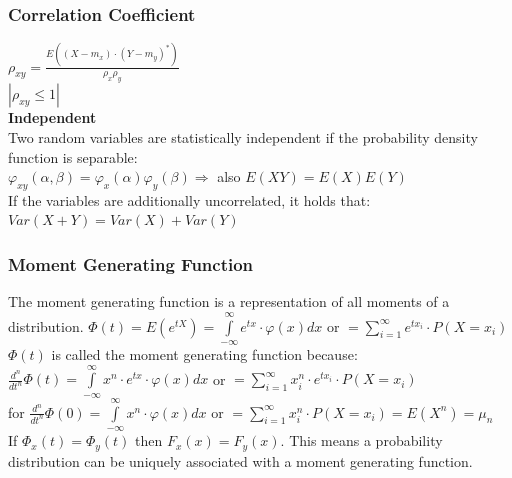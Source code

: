         \subsubsection{Correlation Coefficient}
		$\rho_{xy}=\frac{E((X-m_x)\cdot(Y-m_y)^*)}{\rho_x \rho_y}$\\
		$|\rho_{xy}\leq 1|$ \\
		\textbf{Independent}\\
        Two random variables are statistically independent if the probability density function is separable: \\
        $\varphi_{xy}(\alpha, \beta) = \varphi_x(\alpha)\varphi_y(\beta) \Longrightarrow$ also $E(XY)=E(X)E(Y)$ \\
        If the variables are additionally uncorrelated, it holds that: $Var(X+Y) = Var(X) + Var(Y)$


		\subsubsection{Moment Generating Function}
        The moment generating function is a representation of all moments of a distribution.
        $\Phi(t)=E(e^{tX})=\int\limits_{-\infty}^\infty e^{tx} \cdot \varphi(x) dx$ or $= \sum\limits_{i=1}^{\infty}e^{tx_i} \cdot P(X=x_i)$  \\
        $\Phi(t)$ is called the moment generating function because: \\
        $\frac{d^n}{dt^n}\Phi(t)=\int\limits_{-\infty}^\infty x^n \cdot e^{tx} \cdot \varphi(x) dx$ or $= \sum\limits_{i=1}^{\infty} x_i^n \cdot e^{tx_i} \cdot P(X=x_i)$\\
        for $\frac{d^n}{dt^n}\Phi(0)=\int\limits_{-\infty}^\infty x^n \cdot \varphi(x) dx$ or $= \sum\limits_{i=1}^{\infty} x_i^n \cdot P(X=x_i) = E(X^n)=\mu_n $\\

        If $\Phi_x(t) = \Phi_y(t)$ then $F_x(x)=F_y(x)$. This means a probability distribution can be uniquely associated with a moment generating function.


